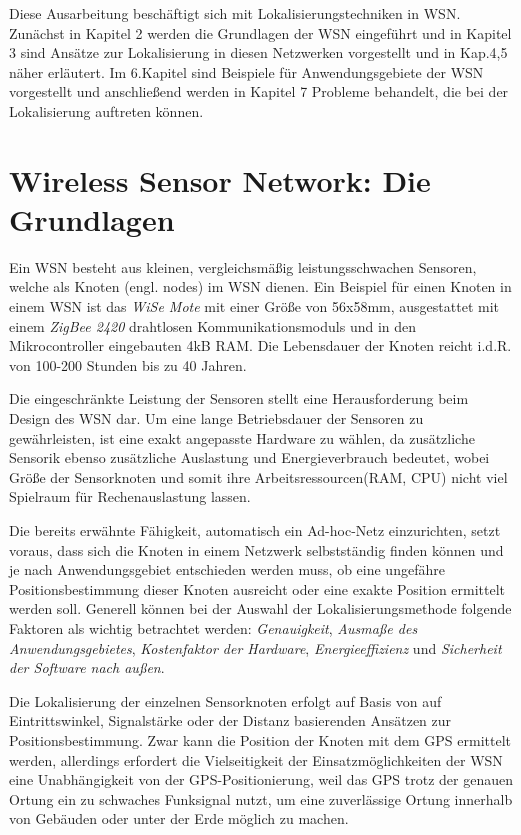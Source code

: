\documentclass[12pt, a4wide]{scrreprt}
\begin{document}
Diese Ausarbeitung beschäftigt sich mit Lokalisierungstechniken in \acs{WSN}. Zunächst in Kapitel 2 werden die Grundlagen der \acs{WSN} eingeführt und in Kapitel 3 sind Ansätze zur Lokalisierung in diesen Netzwerken vorgestellt und in Kap.4,5 näher erläutert. Im 6.Kapitel sind Beispiele für Anwendungsgebiete der \acs{WSN} vorgestellt und anschließend werden in Kapitel 7 Probleme behandelt, die bei der Lokalisierung auftreten können.


\chapter{Wireless Sensor Network: Die Grundlagen}
Ein WSN besteht aus kleinen, vergleichsmäßig leistungsschwachen Sensoren, welche als Knoten (engl. nodes) im WSN dienen. Ein Beispiel für einen Knoten in einem WSN ist das \textit{WiSe Mote} mit einer Größe von 56x58mm, ausgestattet mit einem \textit{ZigBee 2420} drahtlosen Kommunikationsmoduls und in den Mikrocontroller eingebauten 4kB RAM\cite{WiSe}. Die Lebensdauer der Knoten reicht i.d.R. von 100-200 Stunden\cite{lifetime_study} bis zu 40 Jahren\cite{lisocl}.

Die eingeschränkte Leistung der Sensoren stellt eine Herausforderung beim Design des WSN dar. Um eine lange Betriebsdauer der Sensoren zu gewährleisten, ist eine exakt angepasste Hardware zu wählen, da zusätzliche Sensorik ebenso zusätzliche Auslastung und Energieverbrauch bedeutet, wobei Größe der Sensorknoten und somit ihre Arbeitsressourcen(RAM, CPU) nicht viel Spielraum für Rechenauslastung lassen.

Die bereits erwähnte Fähigkeit, automatisch ein Ad-hoc-Netz einzurichten, setzt voraus, dass sich die Knoten in einem Netzwerk selbstständig finden können und je nach Anwendungsgebiet entschieden werden muss, ob eine ungefähre Positionsbestimmung dieser Knoten ausreicht oder eine exakte Position ermittelt werden soll. Generell können bei der Auswahl der Lokalisierungsmethode folgende Faktoren als wichtig betrachtet werden: \textit{Genauigkeit}, \textit{Ausmaße des Anwendungsgebietes}, \textit{Kostenfaktor der Hardware}, \textit{Energieeffizienz} und \textit{Sicherheit der Software nach außen}\cite{indoor_localization}.

Die Lokalisierung der einzelnen Sensorknoten erfolgt auf Basis von auf Eintrittswinkel, Signalstärke oder der Distanz basierenden Ansätzen zur Positionsbestimmung. Zwar kann die Position der Knoten mit dem GPS ermittelt werden, allerdings erfordert die Vielseitigkeit der Einsatzmöglichkeiten der WSN eine Unabhängigkeit von der GPS-Positionierung, weil das GPS trotz der genauen Ortung ein zu schwaches Funksignal nutzt, um eine zuverlässige  Ortung innerhalb von Gebäuden oder unter der Erde möglich zu machen.
\end{document}
